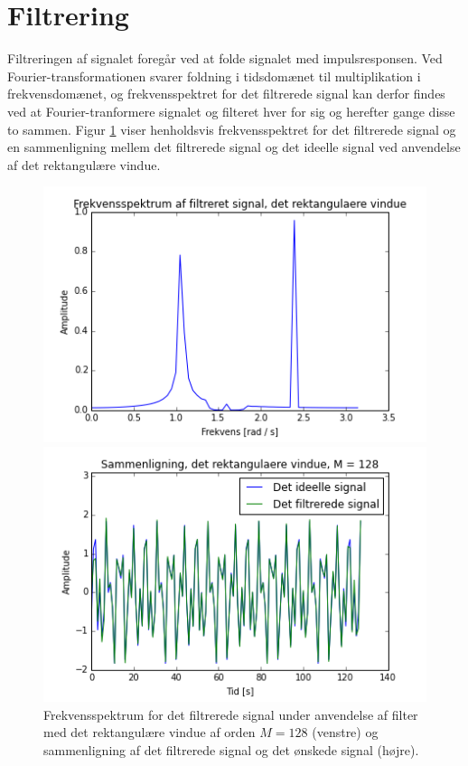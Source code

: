 \section{Filtrering}
Filtreringen af signalet foregår ved at folde signalet med impulsresponsen. Ved Fourier-transformationen svarer foldning i tidsdomænet til multiplikation i frekvensdomænet, og frekvensspektret for det filtrerede signal kan derfor findes ved at Fourier-tranformere signalet og filteret hver for sig og herefter gange disse to sammen. Figur \ref{fig:resultat_rekt} viser henholdsvis frekvensspektret for det filtrerede signal og en sammenligning mellem det filtrerede signal og det ideelle signal ved anvendelse af det rektangulære vindue.

\begin{figure}[H]
\begin{minipage}{0.49\textwidth}
\centering
\includegraphics[width=\textwidth]{figures/Filter/freq_filt_signal_rekt.png}
\end{minipage}
\begin{minipage}{0.49\textwidth}
\centering
\includegraphics[width=\textwidth]{figures/Filter/signal_compare_rekt.png}
\end{minipage}
\caption{Frekvensspektrum for det filtrerede signal under anvendelse af filter med det rektangulære vindue af orden $M=128$ (venstre) og sammenligning af det filtrerede signal og det ønskede signal (højre).}
\label{fig:resultat_rekt}
\end{figure}